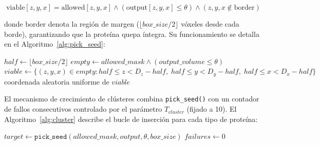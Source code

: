 \begin{enumerate}
    \begin{equation}
    \text{viable}[z, y, x] = \text{allowed}[z, y, x] \land (\text{output}[z, y, x] \leq \theta) \land (z, y, x \notin \text{border})
    \end{equation}

    donde $\text{border}$ denota la región de margen ($\lfloor box\_size/2 \rfloor$ vóxeles desde cada borde), garantizando que la proteína quepa íntegra. Su funcionamiento se detalla en el Algoritmo~\ref{alg:pick_seed}:

    \begin{algorithm}[H]
        \caption{\texttt{pick\_seed}: muestreo uniforme de semilla válida}
        \label{alg:pick_seed}
        $half \gets \lfloor box\_size / 2 \rfloor$\;
        $empty \gets allowed\_mask \land (output\_volume \leq \theta)$\;
        $viable \gets \{(z,y,x) \in empty : half \leq z < D_z{-}half,\; half \leq y < D_y{-}half,\; half \leq x < D_x{-}half\}$\;
        \Return coordenada aleatoria uniforme de $viable$\;
    \end{algorithm}

    El mecanismo de crecimiento de clústeres combina \texttt{pick\_seed()} con un contador de fallos consecutivos controlado por el parámetro $T_{cluster}$ (fijado a 10). El Algoritmo~\ref{alg:cluster} describe el bucle de inserción para cada tipo de proteína:

    \begin{algorithm}[H]
        \caption{Crecimiento de clúster guiado por semilla}
        \label{alg:cluster}
        $target \gets \texttt{pick\_seed}(allowed\_mask, output, \theta, box\_size)$\;
        $failures \gets 0$\;
    \end{algorithm}


\end{enumerate}
